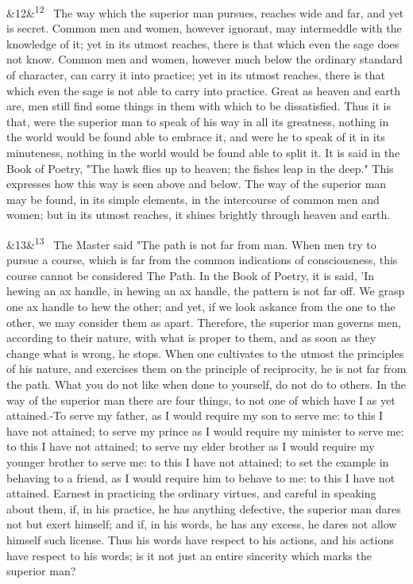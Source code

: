 \documentclass[12pt]{article}
\newcommand{\para}[1][]{\par\noindent\ifx&#1&\else\textsuperscript{\footnotesize #1}~\fi}
\begin{document}
\para[12] The way which the superior man pursues, reaches wide and far, and yet is secret. Common men and women, however ignorant, may intermeddle with the knowledge of it; yet in its utmost reaches, there is that which even the sage does not know. Common men and women, however much below the ordinary standard of character, can carry it into practice; yet in its utmost reaches, there is that which even the sage is not able to carry into practice. Great as heaven and earth are, men still find some things in them with which to be dissatisfied. Thus it is that, were the superior man to speak of his way in all its greatness, nothing in the world would be found able to embrace it, and were he to speak of it in its minuteness, nothing in the world would be found able to split it. It is said in the Book of Poetry, "The hawk flies up to heaven; the fishes leap in the deep." This expresses how this way is seen above and below. The way of the superior man may be found, in its simple elements, in the intercourse of common men and women; but in its utmost reaches, it shines brightly through heaven and earth.

\para[13] The Master said "The path is not far from man. When men try to pursue a course, which is far from the common indications of consciousness, this course cannot be considered The Path. In the Book of Poetry, it is said, 'In hewing an ax handle, in hewing an ax handle, the pattern is not far off. We grasp one ax handle to hew the other; and yet, if we look askance from the one to the other, we may consider them as apart. Therefore, the superior man governs men, according to their nature, with what is proper to them, and as soon as they change what is wrong, he stops. When one cultivates to the utmost the principles of his nature, and exercises them on the principle of reciprocity, he is not far from the path. What you do not like when done to yourself, do not do to others. In the way of the superior man there are four things, to not one of which have I as yet attained.-To serve my father, as I would require my son to serve me: to this I have not attained; to serve my prince as I would require my minister to serve me: to this I have not attained; to serve my elder brother as I would require my younger brother to serve me: to this I have not attained; to set the example in behaving to a friend, as I would require him to behave to me: to this I have not attained. Earnest in practicing the ordinary virtues, and careful in speaking about them, if, in his practice, he has anything defective, the superior man dares not but exert himself; and if, in his words, he has any excess, he dares not allow himself such license. Thus his words have respect to his actions, and his actions have respect to his words; is it not just an entire sincerity which marks the superior man?
\end{document}
